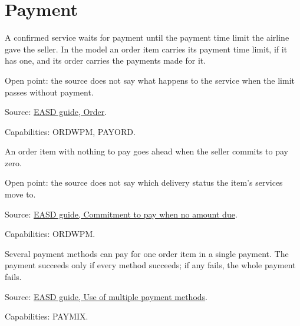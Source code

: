 
\section{Payment}

\begin{definition}
  \label{def:c11-payment-time-limit}
  A confirmed service waits for payment until the payment time limit the
  airline gave the seller.  In the model an order item carries its payment
  time limit, if it has one, and its order carries the payments made for it.

  Open point: the source does not say what happens to the service when the
  limit passes without payment.

  Source: \href{https://standards.atlassian.net/wiki/spaces/EASD/pages/574849062/Order}{EASD guide, Order}.

  Capabilities: ORDWPM, PAYORD.
\end{definition}

\begin{definition}
  \label{def:c12-zero-commitment}
  \notready
  An order item with nothing to pay goes ahead when the seller commits to pay
  zero.

  Open point: the source does not say which delivery status the item's
  services move to.

  Source: \href{https://standards.atlassian.net/wiki/spaces/EASD/pages/2593488900/Commitment+to+pay+when+no+amount+due}{EASD guide, Commitment to pay when no amount due}.

  Capabilities: ORDWPM.
\end{definition}

\begin{definition}
  \label{def:c13-several-methods}
  Several payment methods can pay for one order item in a single payment.  The
  payment succeeds only if every method succeeds; if any fails, the whole
  payment fails.

  Source: \href{https://standards.atlassian.net/wiki/spaces/EASD/pages/2592899087/Use+of+multiple+payment+methods+to+pay+for+a+single+item}{EASD guide, Use of multiple payment methods}.

  Capabilities: PAYMIX.
\end{definition}

